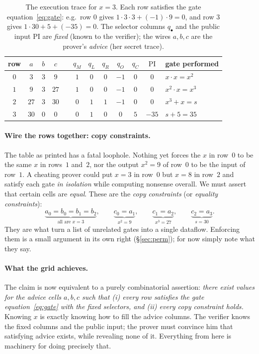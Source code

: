 \documentclass[11pt,a4paper]{article}
\theoremstyle{definition}
\begin{document}
\begin{table}[htbp]
\centering
\begin{tabular}{c ccc c ccccc c l}
\toprule
row & $a$ & $b$ & $c$ & \phantom{x} & $q_M$ & $q_L$ & $q_R$ & $q_O$ & $q_C$ & $\mathrm{PI}$ & gate performed \\
\midrule
$0$ & $3$  & $3$ & $9$  && $1$ & $0$ & $0$ & $-1$ & $0$ & $0$   & $x\cdot x = x^2$ \\
$1$ & $9$  & $3$ & $27$ && $1$ & $0$ & $0$ & $-1$ & $0$ & $0$   & $x^2\cdot x = x^3$ \\
$2$ & $27$ & $3$ & $30$ && $0$ & $1$ & $1$ & $-1$ & $0$ & $0$   & $x^3 + x = s$ \\
$3$ & $30$ & $0$ & $0$  && $0$ & $1$ & $0$ & $0$  & $5$ & $-35$ & $s + 5 = 35$ \\
\bottomrule
\end{tabular}
\caption{The execution trace for $x = 3$. Each row satisfies the gate
equation~\eqref{eq:gate}: e.g.\ row $0$ gives $1\cdot 3\cdot 3 + (-1)\cdot 9 = 0$,
and row $3$ gives $1\cdot 30 + 5 + (-35) = 0$. The selector columns
$q_\bullet$ and the public input $\mathrm{PI}$ are \emph{fixed} (known to the
verifier); the wires $a,b,c$ are the prover's \emph{advice} (her secret
trace).}\label{tab:trace}
\end{table}

\paragraph{Wire the rows together: copy constraints.} The table as printed has
a fatal loophole. Nothing yet forces the $x$ in row~$0$ to be the same $x$ in
rows~$1$ and~$2$, nor the output $x^2 = 9$ of row~$0$ to be the input of
row~$1$. A cheating prover could put $x = 3$ in row~$0$ but $x = 8$ in
row~$2$ and satisfy each gate \emph{in isolation} while computing nonsense
overall. We must assert that certain cells are \emph{equal}. These are the
\emph{copy constraints} (or \emph{equality constraints}):
\[
\underbrace{a_0 = b_0 = b_1 = b_2}_{\text{all are } x = 3}, \qquad
\underbrace{c_0 = a_1}_{x^2 = 9}, \qquad
\underbrace{c_1 = a_2}_{x^3 = 27}, \qquad
\underbrace{c_2 = a_3}_{s = 30}.
\]
They are what turn a list of unrelated gates into a single dataflow. Enforcing
them is a small argument in its own right (\S\ref{sec:perm}); for now simply
note what they say.

\paragraph{What the grid achieves.} The claim is now equivalent to a purely
combinatorial assertion: \emph{there exist values for the advice cells
$a, b, c$ such that (i) every row satisfies the gate
equation~\eqref{eq:gate} with the fixed selectors, and (ii) every copy
constraint holds.} Knowing $x$ is exactly knowing how to fill the advice
columns. The verifier knows the fixed columns and the public input; the
prover must convince him that satisfying advice exists, while revealing none
of it. Everything from here is machinery for doing precisely that.
\end{document}
